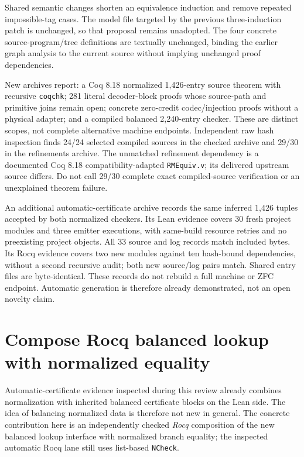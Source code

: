 \documentclass[11pt]{article}
\begin{document}
Shared semantic changes shorten an equivalence induction and remove repeated impossible-tag cases. The model file targeted by the previous three-induction patch is unchanged, so that proposal remains unadopted. The four concrete source-program/tree definitions are textually unchanged, binding the earlier graph analysis to the current source without implying unchanged proof dependencies.

New archives report: a Coq 8.18 normalized 1,426-entry source theorem with recursive \texttt{coqchk}; 281 literal decoder-block proofs whose source-path and primitive joins remain open; concrete zero-credit codec/injection proofs without a physical adapter; and a compiled balanced 2,240-entry checker. These are distinct scopes, not complete alternative machine endpoints. Independent raw hash inspection finds 24/24 selected compiled sources in the checked archive and 29/30 in the refinements archive. The unmatched refinement dependency is a documented Coq 8.18 compatibility-adapted \texttt{RMEquiv.v}; its delivered upstream source differs. Do not call 29/30 complete exact compiled-source verification or an unexplained theorem failure.

An additional automatic-certificate archive records the same inferred 1,426 tuples accepted by both normalized checkers. Its Lean evidence covers 30 fresh project modules and three emitter executions, with same-build resource retries and no preexisting project objects. All 33 source and log records match included bytes. Its Rocq evidence covers two new modules against ten hash-bound dependencies, without a second recursive audit; both new source/log pairs match. Shared entry files are byte-identical. These records do not rebuild a full machine or ZFC endpoint. Automatic generation is therefore already demonstrated, not an open novelty claim.

\section{Compose Rocq balanced lookup with normalized equality}
Automatic-certificate evidence inspected during this review already combines normalization with inherited balanced certificate blocks on the Lean side. The idea of balancing normalized data is therefore not new in general. The concrete contribution here is an independently checked \emph{Rocq} composition of the new balanced lookup interface with normalized branch equality; the inspected automatic Rocq lane still uses list-based \texttt{NCheck}.
\end{document}

